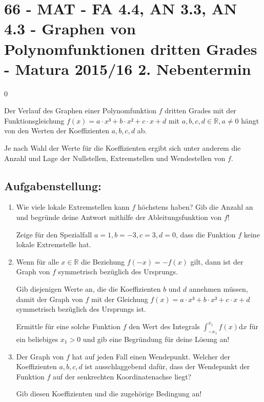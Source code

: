 \section{66 - MAT - FA 4.4, AN 3.3, AN 4.3 - Graphen von Polynomfunktionen dritten Grades - Matura 2015/16 2. Nebentermin}

\begin{langesbeispiel} \item[0] %
	
Der Verlauf des Graphen einer Polynomfunktion $f$ dritten Grades mit der Funktionsgleichung $f(x)=a\cdot x³+b\cdot x²+c\cdot x+d$ mit $a,b,c,d\in\mathbb{R}, a\neq 0$ hängt von den Werten der Koeffizienten $a,b,c,d$ ab.

Je nach Wahl der Werte für die Koeffizienten ergibt sich unter anderem die Anzahl und Lage der Nullstellen, Extremstellen und Wendestellen von $f$. 

\subsection{Aufgabenstellung:}
\begin{enumerate}
	\item Wie viele lokale Extremstellen kann $f$ höchstens haben? Gib die Anzahl an und begründe deine Antwort mithilfe der Ableitungsfunktion von $f$! \leer
	
	 Zeige für den Spezialfall $a=1, b=-3, c=3, d=0$, dass die Funktion $f$ keine lokale Extremstelle hat.\leer
	
	\item Wenn für alle $x\in\mathbb{R}$ die Beziehung $f(-x)=-f(x)$ gilt, dann ist der Graph von $f$ symmetrisch bezüglich des Ursprungs.\leer
	
	Gib diejenigen Werte an, die die Koeffizienten $b$ und $d$ annehmen müssen, damit der Graph von $f$ mit der Gleichung $f(x)=a\cdot x³+b\cdot x²+c\cdot x+d$ symmetrisch bezüglich des Ursprungs ist.\leer
	
	Ermittle für eine solche Funktion $f$ den Wert des Integrals $\int^{x_1}_{-x_1}{f(x)}$d$x$ für ein beliebiges $x_1>0$ und gib eine Begründung für deine Lösung an!\leer
	
	\item Der Graph von $f$ hat auf jeden Fall einen Wendepunkt. Welcher der Koeffizienten $a, b, c, d$ ist ausschlaggebend dafür, dass der Wendepunkt der Funktion $f$ auf der senkrechten Koordinatenachse liegt? 
	
	Gib diesen Koeffizienten und die zugehörige Bedingung an!\leer
	

\end{enumerate}
\end{langesbeispiel}
